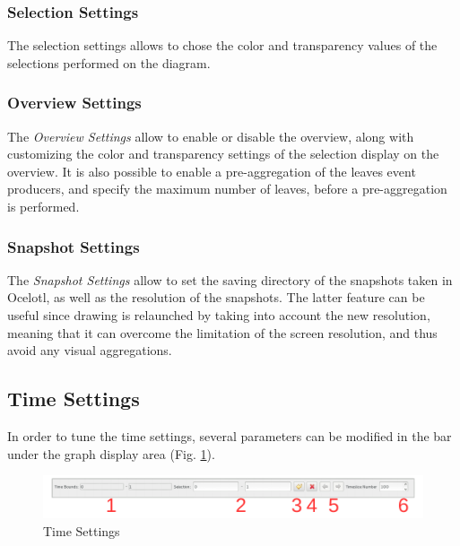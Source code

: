 \documentclass[twoside]{article}
\begin{document}
\begin{sloppypar}
\subsubsection{Selection Settings}
The selection settings allows to chose the color and transparency values of the selections performed on the diagram.

\subsubsection{Overview Settings}
The \textit{Overview Settings} allow to enable or disable the overview, along with customizing the color and transparency settings of the selection display on the overview. It is also possible to enable a pre-aggregation of the leaves event producers, and specify the maximum number of leaves, before a pre-aggregation is performed. 

\subsubsection{Snapshot Settings}
The \textit{Snapshot Settings} allow to set the saving directory of the snapshots taken in Ocelotl, as well as the resolution of the snapshots. The latter feature can be useful since drawing is relaunched by taking into account the new resolution, meaning that it can overcome the limitation of the screen resolution, and thus avoid any visual aggregations.

\subsection{Time Settings}
In order to tune the time settings, several parameters can be modified in the bar under the graph display area (Fig. \ref{timeSettings}).
 
\begin{figure}[h!]
	\centering
	\includegraphics[width=1.0\textwidth]{images/ocelotl_bottom_time.pdf}
	\caption{Time Settings}
	\label{timeSettings}
\end{figure}


\end{sloppypar}
\end{document}
